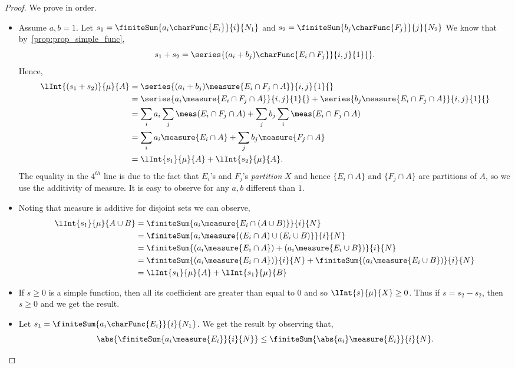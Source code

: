 \begin{proof}
    We prove in order. 
    \begin{itemize}
	\item
	    Assume $a,b = 1$. Let $s_1 = \finiteSum{a_i\charFunc{E_i}}{i}{N_1}$ and 
	    $s_2 = \finiteSum{b_j\charFunc{F_j}}{j}{N_2}$
	    We know that by~\ref{prop:prop_simple_func},
	    \[s_1 + s_2 = \series{(a_i + b_j)\charFunc{E_i\cap F_j}}{i,j}{1}{}.\]
	    Hence,
	    \begin{align*}
		\lInt{(s_1 + s_2)}{\mu}{A} &= 
		\series{(a_i + b_j)\measure{{E_i\cap F_j\cap A}}}{i,j}{1}{}\\  
		& = \series{a_i\measure{{E_i\cap F_j\cap A}}}{i,j}{1}{} + 
		\series{b_j\measure{{E_i\cap F_j\cap A}}}{i,j}{1}{} \\
		& = \sum\limits_{i}a_{i}\sum\limits_{j}\meas(E_i\cap F_j\cap A)  +
		\sum\limits_{j}b_{j}\sum\limits_{i}\meas(E_i\cap F_j\cap A)\\
		& = \sum\limits_{i}a_{i}\measure{E_i\cap A} + 
		\sum\limits_{j}b_{j}\measure{F_j\cap A}\\
		& = \lInt{s_1}{\mu}{A} + \lInt{s_2}{\mu}{A}.
	    \end{align*}
	    The equality in the $4^{th}$ line is due to the fact that $E_i$'s and $F_j$'s \emph{partition}
	    $X$ and hence $\lbrace E_i\cap A \rbrace$ and $\lbrace F_j\cap A \rbrace$ are partitions of $A$,
	    so we use the additivity of measure. It is easy to observe for any $a,b$ different than $1$.
	\item
	    Noting that measure is additive for disjoint sets we can observe,
	    \begin{align*}
		\lInt{s_1}{\mu}{A\cup B} &= \finiteSum{a_i\measure{E_i\cap (A\cup B)}}{i}{N}\\
		&= \finiteSum{a_i\measure{(E_i\cap A)\cup (E_i\cup B)}}{i}{N}\\
		&= \finiteSum{(a_i\measure{E_i\cap A}) + (a_i\measure{E_i\cup B})}{i}{N}\\
		&= \finiteSum{(a_i\measure{E_i\cap A})}{i}{N} + \finiteSum{(a_i\measure{E_i\cup B})}{i}{N}\\
		&= \lInt{s_1}{\mu}{A} + \lInt{s_1}{\mu}{B}
	    \end{align*}
	\item
	    If $s \geq 0$ is a simple function, then all its coefficient are greater than equal to $0$ and so
	    $\lInt{s}{\mu}{X} \geq 0$. Thus if $s = s_2 - s_2$, then $s \geq 0$ and we get the result.
	\item
	    Let $s_1 = \finiteSum{a_i\charFunc{E_i}}{i}{N_1}$. We get the result by observing that,
	    \[\abs{\finiteSum{a_i\measure{E_i}}{i}{N}} \leq \finiteSum{\abs{a_i}\measure{E_i}}{i}{N}.\]
    \end{itemize}
\end{proof}
